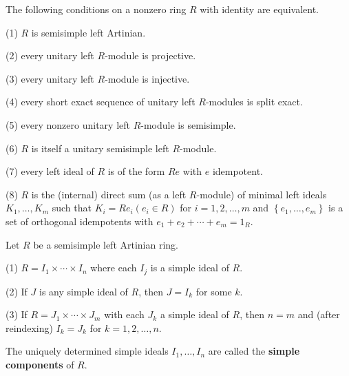 \begin{theorem}
    The following conditions on a nonzero ring $R$ with identity are equivalent.

    (1) $R$ is semisimple left Artinian.

    (2) every unitary left $R$-module is projective.

    (3) every unitary left $R$-module is injective.

    (4) every short exact sequence of unitary left $R$-modules is split exact.

    (5) every nonzero unitary left $R$-module is semisimple.

    (6) $R$ is itself a unitary semisimple left $R$-module.

    (7) every left ideal of $R$ is of the form $Re$ with $e$ idempotent.

    (8) $R$ is the (internal) direct sum (as a left $R$-module) of minimal left ideals $K_1, \ldots, K_{m}$ such that $K_{i}=R e_{i}\left(e_{i} \in R\right)$ for $i=1,2, \ldots, m$ and $\left\{e_1, \ldots, e_{m}\right\}$ is a set of orthogonal idempotents with $e_1+e_2+\cdots+e_{m}=1_{R}$.
\end{theorem}

\begin{theorem}
    \label{thm: Simple decomposition of semisimple left Artinian ring}
    Let $R$ be a semisimple left Artinian ring.

    (1) $R=I_1 \times \cdots \times I_{n}$ where each $I_{j}$ is a simple ideal of $R$.

    (2) If $J$ is any simple ideal of $R$, then $J=I_{k}$ for some $k$.

    (3) If $R=J_1 \times \cdots \times J_{m}$ with each $J_{k}$ a simple ideal of $R$, then $n=m$ and (after reindexing) $I_{k}=J_{k}$ for $k=1,2, \ldots, n$.

    The uniquely determined simple ideals $I_1, \ldots, I_n$  are called the \textbf{simple components} of $R$.
\end{theorem}













